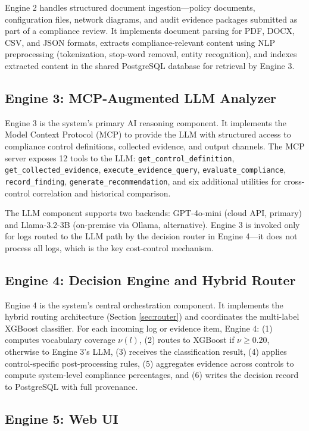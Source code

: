 \documentclass[12pt,oneside]{report}
\begin{document}
Engine 2 handles structured document ingestion—policy documents, configuration files, network diagrams, and audit evidence packages submitted as part of a compliance review. It implements document parsing for PDF, DOCX, CSV, and JSON formats, extracts compliance-relevant content using NLP preprocessing (tokenization, stop-word removal, entity recognition), and indexes extracted content in the shared PostgreSQL database for retrieval by Engine 3.

\subsection{Engine 3: MCP-Augmented LLM Analyzer}

Engine 3 is the system's primary AI reasoning component. It implements the Model Context Protocol (MCP) \cite{mcp_anthropic} to provide the LLM with structured access to compliance control definitions, collected evidence, and output channels. The MCP server exposes 12 tools to the LLM: \texttt{get\_control\_definition}, \texttt{get\_collected\_evidence}, \texttt{execute\_evidence\_query}, \texttt{evaluate\_compliance}, \texttt{record\_finding}, \texttt{generate\_recommendation}, and six additional utilities for cross-control correlation and historical comparison.

The LLM component supports two backends: GPT-4o-mini (cloud API, primary) and Llama-3.2-3B (on-premise via Ollama, alternative). Engine 3 is invoked only for logs routed to the LLM path by the decision router in Engine 4—it does not process all logs, which is the key cost-control mechanism.

\subsection{Engine 4: Decision Engine and Hybrid Router}

Engine 4 is the system's central orchestration component. It implements the hybrid routing architecture (Section \ref{sec:router}) and coordinates the multi-label XGBoost classifier. For each incoming log or evidence item, Engine 4: (1) computes vocabulary coverage $\nu(l)$, (2) routes to XGBoost if $\nu \geq 0.20$, otherwise to Engine 3's LLM, (3) receives the classification result, (4) applies control-specific post-processing rules, (5) aggregates evidence across controls to compute system-level compliance percentages, and (6) writes the decision record to PostgreSQL with full provenance.

\subsection{Engine 5: Web UI}
\end{document}
